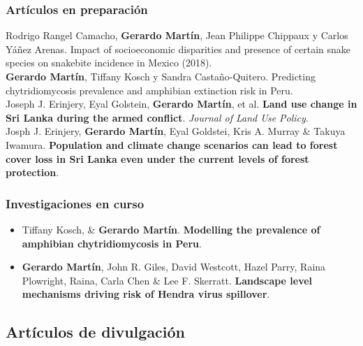\documentclass[11pt, letter]{article}
\newcommand{\years}[1]{\marginnote{\scriptsize #1}}
\begin{document}
\subsubsection*{Art\'iculos en preparaci\'on}

\years{2025} Rodrigo Rangel Camacho, \textbf{Gerardo Martín}, Jean Philippe Chippaux y Carlos Yáñez Arenas. Impact of socioeconomic disparities and presence of certain snake species on snakebite incidence in Mexico (2018).\\

\years{2024} \textbf{Gerardo Martín}, Tiffany Kosch y Sandra Castaño-Quitero. Predicting chytridiomycosis prevalence and amphibian extinction risk in Peru.\\

\years{2022} Joseph J. Erinjery, Eyal Golstein, \textbf{Gerardo Mart\'in}, et al. \textbf{Land use change in Sri Lanka during the armed conflict}. \emph{Journal of Land Use Policy}. \\

\years{2022} Josph J. Erinjery, \textbf{Gerardo Mart\'in}, Eyal Goldstei, Kris A. Murray \& Takuya Iwamura. \textbf{Population and climate change scenarios can lead to forest cover loss in Sri Lanka even under the current levels of forest protection}.\\

\subsubsection*{Investigaciones en curso}

\begin{itemize}
	
	\item Tiffany Kosch, \& \textbf{Gerardo Mart\'in}. \textbf{Modelling the prevalence of amphibian chytridiomycosis in Peru}.\\
	
	\item \textbf{Gerardo Mart\'in}, John R. Giles, David Westcott, Hazel Parry, Raina Plowright, Raina, Carla Chen \& Lee F. Skerratt. \textbf{Landscape level mechanisms driving risk of Hendra virus spillover}.\\
\end{itemize}


\subsection*{Art\'iculos de divulgaci\'on}
\end{document}
